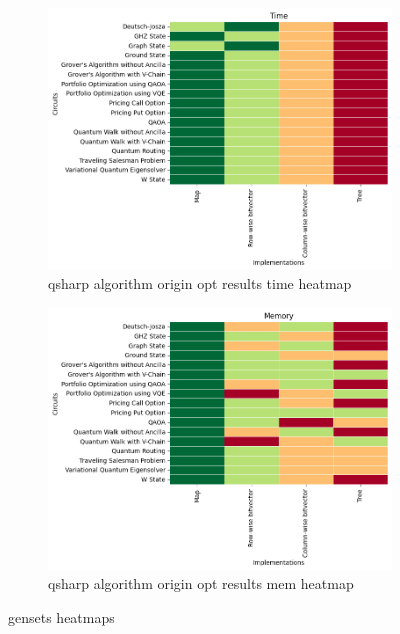 
    \begin{figure}
    \centering
    \begin{subfigure}{.5\textwidth}
      \centering
      \includegraphics[width=1\linewidth]{benchmarks/./qsharp/gensets/algorithm/qsharp_algorithm_origin_opt_results_time_heatmap.png}
      \caption{qsharp algorithm origin opt results time heatmap}
      \label{fig:gensets_qsharp_algorithm_origin_opt_results_time_heatmap}
    \end{subfigure}
    \begin{subfigure}{.5\textwidth}
      \centering
      \includegraphics[width=1\linewidth]{benchmarks/./qsharp/gensets/algorithm/qsharp_algorithm_origin_opt_results_mem_heatmap.png}
      \caption{qsharp algorithm origin opt results mem heatmap}
      \label{fig:gensets_qsharp_algorithm_origin_opt_results_mem_heatmap}
    \end{subfigure}
    \caption{gensets heatmaps}
    \label{fig:gensets_qsharp_algorithm_origin_opt_results_heatmaps}
    \end{figure}
    